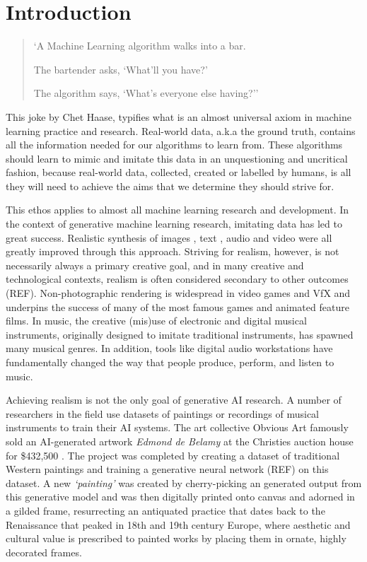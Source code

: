 \chapter{Introduction}
\label{ch:intro}

\begin{quote}

`A Machine Learning algorithm walks into a bar.

The bartender asks, `What'll you have?'

The algorithm says, `What's everyone else having?'' \citep{haase2017bar} \end{quote}

This joke by Chet Haase, typifies what is an almost universal axiom in machine learning practice and research. 
Real-world data, a.k.a the ground truth, contains all the information needed for our algorithms to learn from. 
These algorithms should learn to mimic and imitate this data in an unquestioning and uncritical fashion, because real-world data, collected, created or labelled by humans, is all they will need to achieve the aims that we determine they should strive for.

This ethos applies to almost all machine learning research and development. In the context of generative machine learning research, imitating data has led to great success. 
Realistic synthesis of images \citep{karras2019style}, text \citep{radford2018improving}, audio \citep{oord2016wavenet} and video \citep{openai2024sora} were all greatly improved through this approach. 
Striving for realism, however, is not necessarily always a primary creative goal, and in many creative and technological contexts, realism is often considered secondary to other outcomes (REF). 
Non-photographic rendering is widespread in video games and VfX and underpins the success of many of the most famous games and animated feature films. 
In music, the creative (mis)use of electronic and digital musical instruments, originally designed to imitate traditional instruments, has spawned many musical genres. In addition, tools like digital audio workstations have fundamentally changed the way that people produce, perform, and listen to music.

Achieving realism is not the only goal of generative AI research. 
A number of researchers in the field use datasets of paintings or recordings of musical instruments to train their AI systems. 
The art collective Obvious Art famously sold an AI-generated artwork \textit{Edmond de Belamy} at the Christies auction house for \$432,500 \citep{christies2018edmond}.
The project was completed by creating a dataset of traditional Western paintings and training a generative neural network (REF) on this dataset. 
A new \textit{`painting’} was created by cherry-picking an generated output from this generative model and was then digitally printed onto canvas and adorned in a gilded frame, resurrecting an antiquated practice that dates back to the Renaissance that peaked in 18th and 19th century Europe, where aesthetic and cultural value is prescribed to painted works by placing them in ornate, highly decorated frames.

